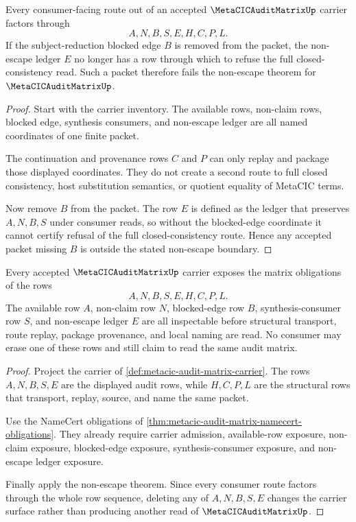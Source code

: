 \begin{theorem}
\label{thm:metacic-audit-matrix-nonescape}
Every consumer-facing route out of an accepted $\MetaCICAuditMatrixUp$ carrier factors through
$$
A,N,B,S,E,H,C,P,L.
$$
If the subject-reduction blocked edge $B$ is removed from the packet, the non-escape ledger $E$ no longer has a row through which to refuse the full closed-consistency read. Such a packet therefore fails the non-escape theorem for $\MetaCICAuditMatrixUp$.
\end{theorem}
\begin{proof}
Start with the carrier inventory. The available rows, non-claim rows, blocked edge, synthesis consumers, and non-escape ledger are all named coordinates of one finite packet.

The continuation and provenance rows $C$ and $P$ can only replay and package those displayed coordinates. They do not create a second route to full closed consistency, host substitution semantics, or quotient equality of MetaCIC terms.

Now remove $B$ from the packet. The row $E$ is defined as the ledger that preserves $A,N,B,S$ under consumer reads, so without the blocked-edge coordinate it cannot certify refusal of the full closed-consistency route. Hence any accepted packet missing $B$ is outside the stated non-escape boundary.
\end{proof}

\begin{theorem}
\label{thm:metacic-audit-matrix-obligation-surface}
Every accepted $\MetaCICAuditMatrixUp$ carrier exposes the matrix obligations of the rows
$$
A,N,B,S,E,H,C,P,L .
$$
The available row $A$, non-claim row $N$, blocked-edge row $B$, synthesis-consumer row $S$, and non-escape ledger $E$ are all inspectable before structural transport, route replay, package provenance, and local naming are read. No consumer may erase one of these rows and still claim to read the same audit matrix.
\end{theorem}
\begin{proof}
Project the carrier of \autoref{def:metacic-audit-matrix-carrier}. The rows $A,N,B,S,E$ are the displayed audit rows, while $H,C,P,L$ are the structural rows that transport, replay, source, and name the same packet.

Use the NameCert obligations of \autoref{thm:metacic-audit-matrix-namecert-obligations}. They already require carrier admission, available-row exposure, non-claim exposure, blocked-edge exposure, synthesis-consumer exposure, and non-escape ledger exposure.

Finally apply the non-escape theorem. Since every consumer route factors through the whole row sequence, deleting any of $A,N,B,S,E$ changes the carrier surface rather than producing another read of $\MetaCICAuditMatrixUp$.
\end{proof}

